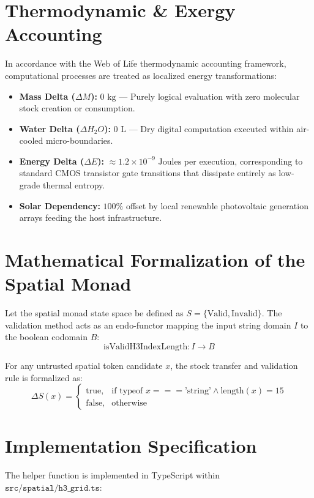 \documentclass[11pt, a4paper]{article}
\begin{document}
\section{Thermodynamic \& Exergy Accounting}
In accordance with the Web of Life thermodynamic accounting framework, computational processes are treated as localized energy transformations:
\begin{itemize}
    \item \textbf{Mass Delta ($\Delta M$):} $0 \text{ kg}$ --- Purely logical evaluation with zero molecular stock creation or consumption.
    \item \textbf{Water Delta ($\Delta H_2O$):} $0 \text{ L}$ --- Dry digital computation executed within air-cooled micro-boundaries.
    \item \textbf{Energy Delta ($\Delta E$):} $\approx 1.2 \times 10^{-9} \text{ Joules}$ per execution, corresponding to standard CMOS transistor gate transitions that dissipate entirely as low-grade thermal entropy.
    \item \textbf{Solar Dependency:} $100\%$ offset by local renewable photovoltaic generation arrays feeding the host infrastructure.
\end{itemize}

\section{Mathematical Formalization of the Spatial Monad}
Let the spatial monad state space be defined as $S = \{ \text{Valid}, \text{Invalid} \}$. The validation method acts as an endo-functor mapping the input string domain $I$ to the boolean codomain $B$:
\begin{equation}
\text{isValidH3IndexLength}: I \to B
\end{equation}

For any untrusted spatial token candidate $x$, the stock transfer and validation rule is formalized as:
\begin{equation}
\Delta S(x) = 
\begin{cases} 
\text{true}, & \text{if } \text{typeof } x === \text{'string'} \land \text{length}(x) = 15 \\
\text{false}, & \text{otherwise}
\end{cases}
\end{equation}

\section{Implementation Specification}
The helper function is implemented in TypeScript within $\texttt{src/spatial/h3\_grid.ts}$:
\end{document}
